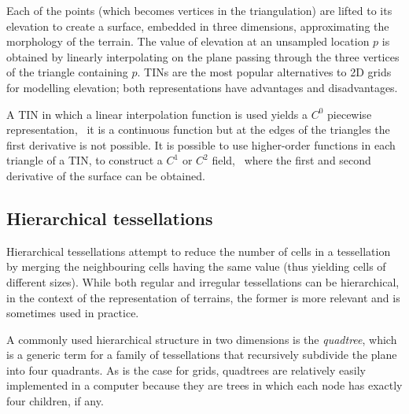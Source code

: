 %

Each of the points (which becomes vertices in the triangulation) are lifted to its elevation to create a surface, embedded in three dimensions, approximating the morphology of the terrain.
The value of elevation at an unsampled location $p$ is obtained by linearly interpolating on the plane passing through the three vertices of the triangle containing $p$. 
TINs are the most popular alternatives to 2D grids for modelling elevation; both representations have advantages and disadvantages.

%
 
A TIN in which a linear interpolation function is used yields a $C^0$ piecewise representation, \ie\ it is a continuous function but at the edges of the triangles the first derivative is not possible.
It is possible to use higher-order functions in each triangle of a TIN, to construct a $C^1$ or $C^2$ field, \ie\ where the first and second derivative of the surface can be obtained. 



\subsection{Hierarchical tessellations}

Hierarchical tessellations attempt to reduce the number of cells in a tessellation by merging the neighbouring cells having the same value (thus yielding cells of different sizes).
While both regular and irregular tessellations can be hierarchical, in the context of the representation of terrains, the former is more relevant and is sometimes used in practice.


%

A commonly used hierarchical structure in two dimensions is the \emph{quadtree}, which is a generic term for a family of tessellations that recursively subdivide the plane into four quadrants.
As is the case for grids, quadtrees are relatively easily implemented in a computer because they are trees in which each node has exactly four children, if any.


